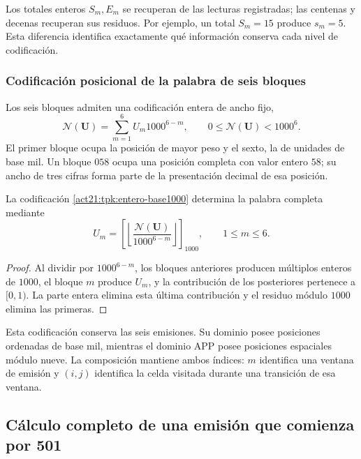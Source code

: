 Los totales enteros \(S_m,E_m\) se recuperan de las lecturas registradas;
las centenas y decenas recuperan sus residuos. Por ejemplo, un total
\(S_m=15\) produce \(s_m=5\). Esta diferencia identifica exactamente
qué información conserva cada nivel de codificación.

\subsubsection{Codificación posicional de la palabra de seis bloques}

Los seis bloques admiten una codificación entera de ancho fijo,
\begin{equation}
 \mathscr N(\mathbf U)=\sum_{m=1}^{6}U_m1000^{6-m},
 \qquad0\leq\mathscr N(\mathbf U)<1000^6.
 \label{act21:tpk:entero-base1000}
\end{equation}
El primer bloque ocupa la posición de mayor peso y el sexto, la de unidades
de base mil. Un bloque \(058\) ocupa una posición completa con valor
entero \(58\); su ancho de tres cifras forma parte de la presentación
decimal de esa posición.

\begin{proposition}
\label{act21:tpk:inversa-base1000}
La codificación \eqref{act21:tpk:entero-base1000} determina la palabra completa
mediante
\[
 U_m=\left[\left\lfloor
 \frac{\mathscr N(\mathbf U)}{1000^{6-m}}\right\rfloor\right]_{1000},
 \qquad1\leq m\leq6.
\]
\end{proposition}
\begin{proof}
Al dividir por \(1000^{6-m}\), los bloques anteriores producen múltiplos
enteros de \(1000\), el bloque \(m\) produce \(U_m\), y la contribución
de los posteriores pertenece a \([0,1)\). La parte entera elimina esta
última contribución y el residuo módulo \(1000\) elimina las primeras.
\end{proof}

Esta codificación conserva las seis emisiones. Su dominio posee posiciones
ordenadas de base mil, mientras el dominio APP posee posiciones espaciales
módulo nueve. La composición mantiene ambos índices: \(m\) identifica una
ventana de emisión y \((i,j)\) identifica la celda visitada durante una
transición de esa ventana.

\subsection{Cálculo completo de una emisión que comienza por 501}
\label{act21:tpk:ejemplo501}

